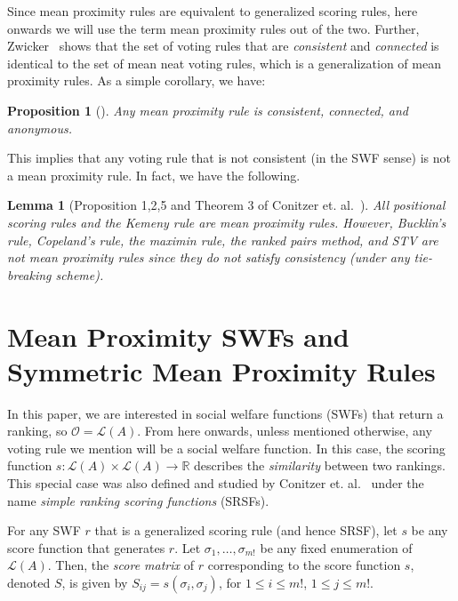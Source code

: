 \documentclass[10pt,letterpaper]{article}
\newcommand{\calL}{{\mathcal{L}}}
\newcommand{\rank}{{\calL(A)}}
\newcommand{\calO}{{\mathcal{O}}}
\newtheorem{lemma}{Lemma}
\newtheorem{proposition}{Proposition}
\newenvironment{definition}[1][Definition]{\begin{trivlist}
\item[\hskip \labelsep {\bfseries #1}]}{\end{trivlist}}
\begin{document}

Since mean proximity rules are equivalent to generalized scoring rules, here onwards we will use the term mean proximity rules out of the two. Further, Zwicker~\cite{Zwicker08b} shows that the set of voting rules that are \emph{consistent} and \emph{connected} is identical to the set of mean neat voting rules, which is a generalization of mean proximity rules. As a simple corollary, we have: 

\begin{proposition}[\cite{Zwicker08b}]
Any mean proximity rule is consistent, connected, and anonymous.
\label{prop:properties}
\end{proposition}

This implies that any voting rule that is not consistent (in the SWF sense) is not a mean proximity rule. In fact, we have the following.

\begin{lemma}[Proposition 1,2,5 and Theorem 3 of Conitzer et. al.~\cite{CRX09}]
All positional scoring rules and the Kemeny rule are mean proximity rules. However, Bucklin's rule, Copeland's rule, the maximin rule, the ranked pairs method, and STV are not mean proximity rules since they do not satisfy consistency (under any tie-breaking scheme). 
\end{lemma}


\section{Mean Proximity SWFs and Symmetric Mean Proximity Rules}

In this paper, we are interested in social welfare functions (SWFs) that return a ranking, so $\calO = \rank$. From here onwards, unless mentioned otherwise, any voting rule we mention will be a social welfare function. In this case, the scoring function $s : \rank \times \rank \rightarrow \mathbb{R}$ describes the \emph{similarity} between two rankings. This special case was also defined and studied by Conitzer et. al.~\cite{CRX09} under the name \emph{simple ranking scoring functions} (SRSFs). 

\begin{definition}[Score Matrix]
For any SWF $r$ that is a generalized scoring rule (and hence SRSF), let $s$ be any score function that generates $r$. Let $\sigma_1,\ldots,\sigma_{m!}$ be any fixed enumeration of $\rank$. Then, the \emph{score matrix} of $r$ corresponding to the score function $s$, denoted $S$, is given by $S_{ij} = s(\sigma_i,\sigma_j)$, for $1 \le i \le m!$, $1 \le j \le m!$. 
\end{definition}
\end{document}
